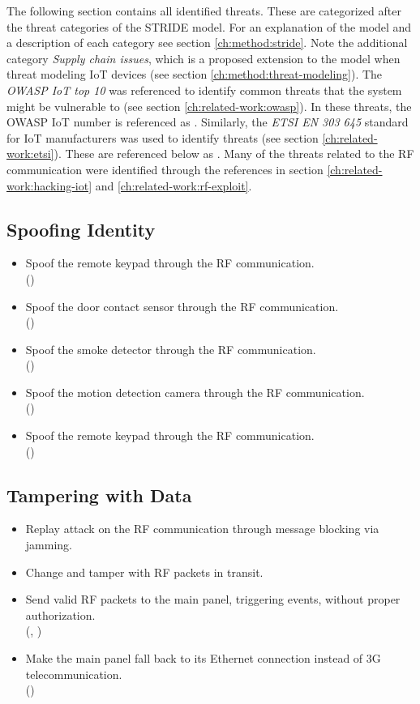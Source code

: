 The following section contains all identified threats. These are categorized after the threat categories of the STRIDE model. For an explanation of the model and a description of each category see section \ref{ch:method:stride}. Note the additional category \textit{Supply chain issues}, which is a proposed extension to the model when threat modeling IoT devices \cite{guzman2017iot} (see section \ref{ch:method:threat-modeling}). The \textit{OWASP IoT top 10} \cite{owasp-iot-top10} was referenced to identify common threats that the system might be vulnerable to (see section \ref{ch:related-work:owasp}). In these threats, the OWASP IoT number is referenced as \textit{}. Similarly, the \textit{ETSI EN 303 645} standard \cite{etsi-iot-standard} for IoT manufacturers was used to identify threats (see section \ref{ch:related-work:etsi}). These are referenced below as \textit{}. Many of the threats related to the RF communication were identified through the references in section \ref{ch:related-work:hacking-iot} and \ref{ch:related-work:rf-exploit}.

\subsection{Spoofing Identity}
\begin{itemize}
    \item Spoof the remote keypad through the RF communication.
    \\ ()
    \item Spoof the door contact sensor through the RF communication.
    \\ ()
    \item Spoof the smoke detector through the RF communication.
    \\ ()
    \item Spoof the motion detection camera through the RF communication.
    \\ ()
    \item Spoof the remote keypad through the RF communication.
    \\ ()
\end{itemize}

\subsection{Tampering with Data}
\begin{itemize}
    \item Replay attack on the RF communication through message blocking via jamming.
    \item Change and tamper with RF packets in transit.
    \item Send valid RF packets to the main panel, triggering events, without proper authorization.
    \\ (, )
    \item Make the main panel fall back to its Ethernet connection instead of 3G telecommunication.
    \\ ()
\end{itemize}

